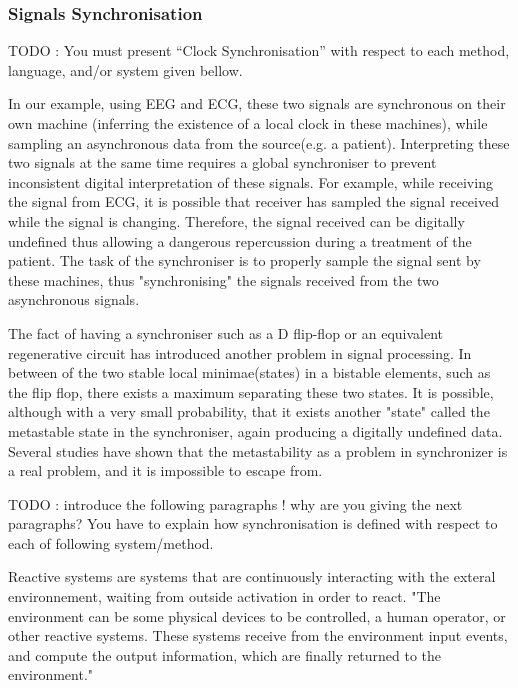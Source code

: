 \subsubsection{Signals Synchronisation}

{\color{red}TODO : You must present ``Clock Synchronisation'' with respect to each method, language, and/or system given bellow.}


In our example, using EEG and ECG, these two signals are synchronous on their own machine (inferring the existence of a local clock in these machines), while sampling an asynchronous data from the source(e.g. a patient). Interpreting these two signals at the same time requires a global synchroniser to prevent inconsistent digital interpretation of these signals. For example, while receiving the signal from ECG, it is possible that receiver has sampled the signal received while the signal is changing. Therefore, the signal received can be digitally undefined thus allowing a dangerous repercussion during a treatment of the patient. The task of the synchroniser is to properly sample the signal sent by these machines, thus "synchronising" the signals received from the two asynchronous signals. 

The fact of having a synchroniser such as a D flip-flop or an equivalent regenerative circuit has introduced another problem in signal processing. In between of the two stable local minimae(states) in a bistable elements, such as the flip flop, there exists a maximum separating these two states. It is possible, although with a very small probability, that it exists another "state" called the metastable state in the synchroniser, again producing a digitally undefined data. Several studies have shown that the metastability as a problem in synchronizer is a real problem, and it is impossible to escape from.   

\bigskip
{\color{red} TODO : introduce the following paragraphs ! why are you giving the next paragraphs? You have to explain how synchronisation is defined with respect to each of following system/method.}

 Reactive systems are systems that are continuously interacting with the exteral environnement, waiting from outside activation in order to react. "The environment can be some physical devices to be controlled, a human operator, or other reactive systems. These systems receive from the environment input events, and compute the output information, which are finally returned to the environment."\cite{SignalPaper} 

